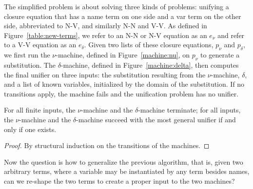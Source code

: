 \documentclass[a4paper,UKenglish]{lipics-v2016}
\newcommand*{\transname}[1]{\textsc{#1}}
\begin{document}
The simplified problem is about solving three kinds of problems:
unifying a closure equation that has a name term on one side
and a var term on the other side,
abbreviated to \transname{N-V},
and similarly \transname{N-N} and \transname{V-V}.
As defined in Figure~\ref{table:new-terms},
we refer to an \transname{N-N} or \transname{N-V} equation as
an \emph{$e_\nu$} and refer to a
\transname{V-V} equation as an \emph{$e_\delta$}.
Given two lists of these closure equations,
$p_\nu$ and $p_\delta$,
we first run the
$\nu$-machine, defined in Figure~\ref{machine:nu},
on $p_\nu$ to generate a substitution.
The $\delta$-machine, defined in Figure~\ref{machine:delta},
then computes the final unifier on three inputs:
the substitution resulting from the $\nu$-machine,
$\delta$, and a list of known variables, initialized by
the domain of the substitution.
If no transitions apply, the machine
fails and the unification problem has no unifier.


\begin{lemma}\label{lemma:numachine}
 For all finite inputs, the $\nu$-machine and the $\delta$-machine
 terminate; for all inputs, the $\nu$-machine and the $\delta$-machine
 succeed with the most general unifier if and only if one exists.
\end{lemma}
\begin{proof}
By structural induction on the transitions of the machines.
\end{proof}


Now the question is how to generalize the previous algorithm, that is,
given two arbitrary terms, where a variable may be instantiated by any
term besides names, can we re-shape the two terms to create a proper
input to the two machines?
\end{document}
